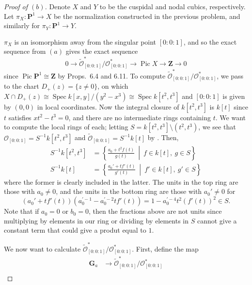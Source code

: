\documentclass[10pt]{article}
\theoremstyle{definition}
\theoremstyle{remark}
\numberwithin{equation}{section}
\numberwithin{figure}{subsubsection}
\DeclareMathOperator{\Spec}{Spec}
\DeclareMathOperator{\Pic}{Pic}
\newcommand{\OO}{\mathcal{O}}
\begin{document}
\begin{proof}[Proof of $(b)$]
  Denote $X$ and $Y$ to be the cuspidal and nodal cubics, respectively.
  Let $\pi_X\colon\mathbf{P}^1 \to X$ be the normalization constructed in the
  previous problem, and similarly for $\pi_Y\colon\mathbf{P}^1 \to Y$.
  \par $\pi_X$ is an isomorphism away from the singular point $[0 : 0 : 1]$, and
  so the exact sequence from $(a)$ gives the exact sequence
  \begin{equation*}
    0 \longrightarrow \tilde{\OO}_{[0:0:1]}^*/\OO_{[0:0:1]}^* \longrightarrow \Pic X
    \longrightarrow \mathbf{Z} \longrightarrow 0
  \end{equation*}
  since $\Pic \mathbf{P}^1 \cong \mathbf{Z}$ by Props.\ 6.4 and 6.11. To
  compute $\tilde{\OO}_{[0:0:1]}^*/\OO_{[0:0:1]}^*$, we pass to the chart $D_+(z)
  = \{z \ne 0\}$, on which $X \cap D_+(z) \cong \Spec k[x,y]/(y^2-x^3) \cong \Spec
  k[t^2,t^3]$ and $[0:0:1]$ is given by $(0,0)$ in local coordinates. Now the
  integral closure of $k[t^2,t^3]$ is $k[t]$ since $t$ satisfies $xt^2 - t^3 =
  0$, and there are no intermediate rings containing $t$. We want to compute the
  local rings of each; letting $S = k[t^2,t^3] \setminus (t^2,t^3)$, we see that
  $\OO_{[0:0:1]} = S^{-1}k[t^2,t^3]$ and $\tilde{\OO}_{[0:0:1]} = S^{-1}k[t]$ by
  \cite[Prop.\ 5.12]{AM69}. Then,
  \begin{align*}
    S^{-1}k[t^2,t^3] &= \left\{ \frac{a_0 + t^2f(t)}{g(t)}\ \middle\vert\
    f \in k[t],\ g \in S\right\}\\
    S^{-1}k[t] &= \left\{ \frac{a_0' + tf'(t)}{g'(t)}\ \middle\vert\
    f' \in k[t],\ g' \in S\right\}
  \end{align*}
  where the former is clearly included in the latter. The units in the top ring
  are those with $a_0 \ne 0$, and the units in the bottom ring are those with
  $a_0' \ne 0$ for
  \begin{equation*}
    (a_0' + tf'(t))(a_0^{\prime-1} - a_0^{\prime-2}tf'(t)) = 1 -
    a_0^{\prime-4}t^2(f'(t))^2 \in S.
  \end{equation*}
  Note that if $a_0 = 0$ or $b_0 = 0$, then the fractions above are not units
  since multiplying by elements in our ring or dividing by elements in $S$
  cannot give a constant term that could give a produt equal to $1$.
  \par We now want to calculate $\tilde{\OO}_{[0:0:1]}^*/\OO_{[0:0:1]}^*$. First,
  define the map
  \begin{align*}
    \mathbf{G}_a &\longrightarrow \tilde{\OO}_{[0:0:1]}^*/\OO_{[0:0:1]}^*\\

\end{align*}
\end{proof}
\end{document}

